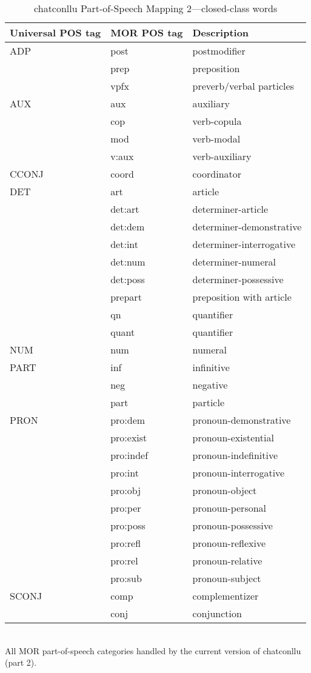 \newpage
\vspace{-2cm}
\begin{table}
\caption {chatconllu Part-of-Speech Mapping 2---closed-class words} \label{tab:posmap2}
\centering
\begin{tabularx}{\linewidth}{@{}llX@{}}
\toprule
\textbf{Universal POS tag} & \textbf{MOR POS tag} & \textbf{Description}\\ \midrule
ADP & post & postmodifier\\
 & prep & preposition\\
 & vpfx & preverb/verbal particles\\\addlinespace
AUX & aux & auxiliary\\
 & cop & verb-copula\\
 & mod & verb-modal\\
 & v:aux & verb-auxiliary\\\addlinespace
CCONJ & coord & coordinator\\\addlinespace
DET & art & article\\
 & det:art & determiner-article\\
 & det:dem & determiner-demonstrative\\
 & det:int & determiner-interrogative\\
 & det:num & determiner-numeral\\
 & det:poss & determiner-possessive\\
 & prepart & preposition with article\\
 & qn & quantifier\\
 & quant & quantifier\\\addlinespace
NUM & num & numeral\\\addlinespace
PART & inf & infinitive\\
 & neg & negative\\
 & part & particle\\\addlinespace
PRON & pro:dem & pronoun-demonstrative\\
 & pro:exist & pronoun-existential\\
 & pro:indef & pronoun-indefinitive\\
 & pro:int & pronoun-interrogative\\
 & pro:obj & pronoun-object\\
 & pro:per & pronoun-personal\\
 & pro:poss & pronoun-possessive\\
 & pro:refl & pronoun-reflexive\\
 & pro:rel & pronoun-relative\\
 & pro:sub & pronoun-subject\\\addlinespace
SCONJ & comp & complementizer\\
 & conj & conjunction\\\bottomrule
\end{tabularx}\\
\vspace{0.5cm}
All MOR part-of-speech categories handled by the current version of chatconllu (part 2).\\
\end{table}
\clearpage

